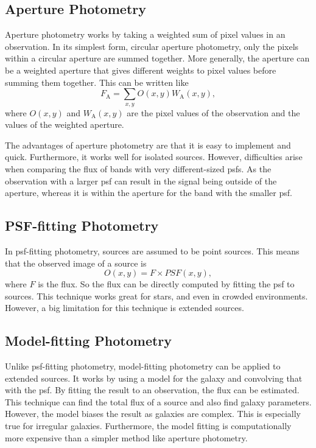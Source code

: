 \subsection{Aperture Photometry}

Aperture photometry works by taking a weighted sum of pixel values in an observation. In its simplest form, circular aperture photometry, only the pixels within a circular aperture are summed together. More generally, the aperture can be a weighted aperture that gives different weights to pixel values before summing them together. This can be written like
\begin{equation}\label{eq: flux}
    F_\mathrm{A} = \sum_{x,y}O(x,y)W_\mathrm{A}(x,y),
\end{equation}
where $O(x,y)$ and $W_\mathrm{A}(x,y)$ are the pixel values of the observation and the values of the weighted aperture.

The advantages of aperture photometry are that it is easy to implement and quick. Furthermore, it works well for isolated sources. However, difficulties arise when comparing the flux of bands with very different-sized \glspl{psf}. As the observation with a larger \gls{psf} can result in the signal being outside of the aperture, whereas it is within the aperture for the band with the smaller \gls{psf}.


\subsection{PSF-fitting Photometry}

In \gls{psf}-fitting photometry, sources are assumed to be point sources. This means that the observed image of a source is 
\begin{equation}
    O(x,y)=F\times PSF(x,y),
\end{equation}
where $F$ is the flux. So the flux can be directly computed by fitting the \gls{psf} to sources. This technique works great for stars, and even in crowded environments. However, a big limitation for this technique is extended sources. 

\subsection{Model-fitting Photometry}

Unlike \gls{psf}-fitting photometry, model-fitting photometry can be applied to extended sources. It works by using a model for the galaxy and convolving that with the \gls{psf}. By fitting the result to an observation, the flux can be estimated. This technique can find the total flux of a source and also find galaxy parameters. However, the model biases the result as galaxies are complex. This is especially true for irregular galaxies. Furthermore, the model fitting is computationally more expensive than a simpler method like aperture photometry.

